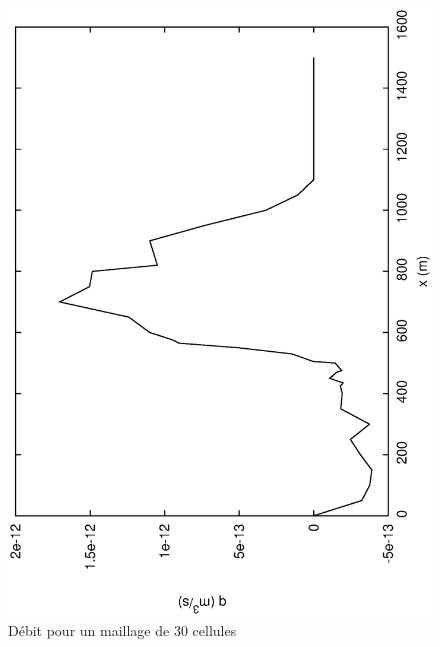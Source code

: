 \documentclass[a4paper,10pt]{article}
\begin{document}
\begin{figure}
 \begin{center}
  \includegraphics[angle=270,width=15cm]{Q50.eps}
  \caption{Débit pour un maillage de 30 cellules}
  \label{fig5}
 \end{center}
\end{figure}
\end{document}
